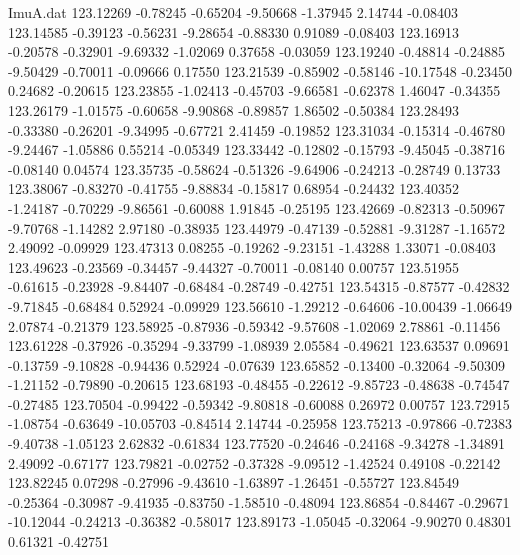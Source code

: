 \begin{filecontents}{ImuA.dat}
 123.12269   -0.78245   -0.65204   -9.50668   -1.37945    2.14744   -0.08403
 123.14585   -0.39123   -0.56231   -9.28654   -0.88330    0.91089   -0.08403
 123.16913   -0.20578   -0.32901   -9.69332   -1.02069    0.37658   -0.03059
 123.19240   -0.48814   -0.24885   -9.50429   -0.70011   -0.09666    0.17550
 123.21539   -0.85902   -0.58146  -10.17548   -0.23450    0.24682   -0.20615
 123.23855   -1.02413   -0.45703   -9.66581   -0.62378    1.46047   -0.34355
 123.26179   -1.01575   -0.60658   -9.90868   -0.89857    1.86502   -0.50384
 123.28493   -0.33380   -0.26201   -9.34995   -0.67721    2.41459   -0.19852
 123.31034   -0.15314   -0.46780   -9.24467   -1.05886    0.55214   -0.05349
 123.33442   -0.12802   -0.15793   -9.45045   -0.38716   -0.08140    0.04574
 123.35735   -0.58624   -0.51326   -9.64906   -0.24213   -0.28749    0.13733
 123.38067   -0.83270   -0.41755   -9.88834   -0.15817    0.68954   -0.24432
 123.40352   -1.24187   -0.70229   -9.86561   -0.60088    1.91845   -0.25195
 123.42669   -0.82313   -0.50967   -9.70768   -1.14282    2.97180   -0.38935
 123.44979   -0.47139   -0.52881   -9.31287   -1.16572    2.49092   -0.09929
 123.47313    0.08255   -0.19262   -9.23151   -1.43288    1.33071   -0.08403
 123.49623   -0.23569   -0.34457   -9.44327   -0.70011   -0.08140    0.00757
 123.51955   -0.61615   -0.23928   -9.84407   -0.68484   -0.28749   -0.42751
 123.54315   -0.87577   -0.42832   -9.71845   -0.68484    0.52924   -0.09929
 123.56610   -1.29212   -0.64606  -10.00439   -1.06649    2.07874   -0.21379
 123.58925   -0.87936   -0.59342   -9.57608   -1.02069    2.78861   -0.11456
 123.61228   -0.37926   -0.35294   -9.33799   -1.08939    2.05584   -0.49621
 123.63537    0.09691   -0.13759   -9.10828   -0.94436    0.52924   -0.07639
 123.65852   -0.13400   -0.32064   -9.50309   -1.21152   -0.79890   -0.20615
 123.68193   -0.48455   -0.22612   -9.85723   -0.48638   -0.74547   -0.27485
 123.70504   -0.99422   -0.59342   -9.80818   -0.60088    0.26972    0.00757
 123.72915   -1.08754   -0.63649  -10.05703   -0.84514    2.14744   -0.25958
 123.75213   -0.97866   -0.72383   -9.40738   -1.05123    2.62832   -0.61834
 123.77520   -0.24646   -0.24168   -9.34278   -1.34891    2.49092   -0.67177
 123.79821   -0.02752   -0.37328   -9.09512   -1.42524    0.49108   -0.22142
 123.82245    0.07298   -0.27996   -9.43610   -1.63897   -1.26451   -0.55727
 123.84549   -0.25364   -0.30987   -9.41935   -0.83750   -1.58510   -0.48094
 123.86854   -0.84467   -0.29671  -10.12044   -0.24213   -0.36382   -0.58017
 123.89173   -1.05045   -0.32064   -9.90270    0.48301    0.61321   -0.42751

\end{filecontents}
